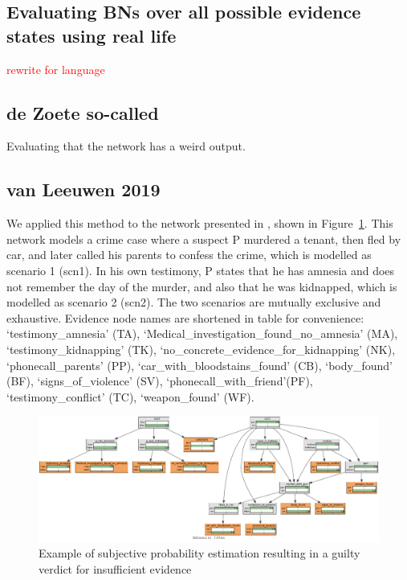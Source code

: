 \documentclass[12pt]{article}
\begin{document}
\subsection{Evaluating BNs over all possible evidence states using real life}

 \textcolor{red} {rewrite for language}
 
 \subsection{de Zoete so-called}
 Evaluating that the network has a weird output.
 
 \subsection{van Leeuwen 2019}


We applied this method to the network presented in \citet{vanLeeuwen2019}, shown in Figure~\ref{love}.  This network models a crime case where a suspect P murdered a tenant, then fled by car, and later called his parents to confess the crime, which is modelled as scenario 1 (scn1). In his own testimony, P states that he has amnesia and does not remember the day of the murder, and also that he was kidnapped, which is modelled as scenario 2 (scn2). The two scenarios are mutually exclusive and exhaustive. Evidence node names are shortened in table for convenience: `testimony\_amnesia' (TA), `Medical\_investigation\_found\_no\_amnesia' (MA), `testimony\_kidnapping' (TK), `no\_concrete\_evidence\_for\_kidnapping' (NK), `phonecall\_parents' (PP),  `car\_with\_bloodstains\_found' (CB), `body\_found' (BF), `signs\_of\_violence' (SV), `phonecall\_with\_friend'(PF), `testimony\_conflict' (TC), `weapon\_found' (WF).


\begin{figure}[htbp]
\includegraphics[width=\linewidth]{images/oldnetwork.pdf}
\caption{Example of subjective probability estimation resulting in a guilty verdict for insufficient evidence}
\label{love}
\end{figure}%
\end{document}
